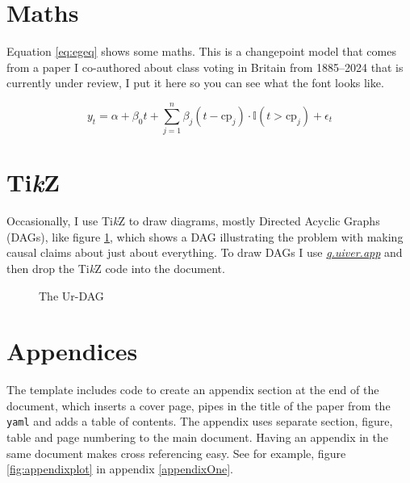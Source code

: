 \documentclass[
  a4paper,
  twoside]{article}
\begin{document}
\section{Maths}\label{maths}

Equation \eqref{eq:egeq} shows some maths. This is a changepoint model that comes from a paper I co-authored about class voting in Britain from 1885--2024 that is currently under review, I put it here so you can see what the font looks like.

\begin{equation}
\label{eq:egeq}
y_t = \alpha + \beta_0 t + \sum_{j=1}^{n} \beta_j (t - \text{cp}_j) \cdot \mathbb{I}(t > \text{cp}_j) + \epsilon_t
\end{equation}

\section{\texorpdfstring{Ti\emph{k}Z}{TikZ}}\label{tikz}

Occasionally, I use Ti\emph{k}Z to draw diagrams, mostly Directed Acyclic Graphs (DAGs), like figure \ref{fig:urdag}, which shows a DAG illustrating the problem with making causal claims about just about everything. To draw DAGs I use \href{https://q.uiver.app/}{\emph{q.uiver.app}} and then drop the Ti\emph{k}Z code into the document.

\begin{figure}[H]
\centering
{}
\caption{The Ur-DAG}
\label{fig:urdag}
\end{figure}

\section{Appendices}\label{appendices}

The template includes code to create an appendix section at the end of the document, which inserts a cover page, pipes in the title of the paper from the \texttt{yaml} and adds a table of contents. The appendix uses separate section, figure, table and page numbering to the main document. Having an appendix in the same document makes cross referencing easy. See for example, figure \ref{fig:appendixplot} in appendix \ref{appendixOne}.
\end{document}
